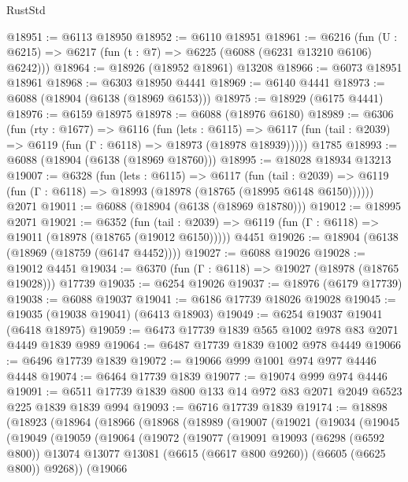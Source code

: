 \begin{lexlean}{RustStd}
\begin{coremodule}
@18951 := @6113 @18950
@18952 := @6110 @18951
@18961 := @6216
    (fun (U : @6215) => @6217 (fun (t : @7) => @6225 (@6088 (@6231 @13210 @6106) @6242)))
@18964 := @18926 (@18952 @18961) @13208
@18966 := @6073 @18951 @18961
@18968 := @6303 @18950 @4441
@18969 := @6140 @4441
@18973 := @6088 (@18904 (@6138 (@18969 @6153)))
@18975 := @18929 (@6175 @4441)
@18976 := @6159 @18975
@18978 := @6088 (@18976 @6180)
@18989 := @6306
    (fun (rty : @1677) =>
    @6116
      (fun (lets : @6115) =>
      @6117 (fun (tail : @2039) => @6119 (fun (Γ : @6118) => @18973 (@18978 @18939)))))
    @1785
@18993 := @6088 (@18904 (@6138 (@18969 @18760)))
@18995 := @18028 @18934 @13213
@19007 := @6328
    (fun (lets : @6115) =>
    @6117
      (fun (tail : @2039) =>
      @6119 (fun (Γ : @6118) => @18993 (@18978 (@18765 (@18995 @6148 @6150))))))
    @2071
@19011 := @6088 (@18904 (@6138 (@18969 @18780)))
@19012 := @18995 @2071
@19021 := @6352
    (fun (tail : @2039) => @6119 (fun (Γ : @6118) => @19011 (@18978 (@18765 (@19012 @6150)))))
    @4451
@19026 := @18904 (@6138 (@18969 (@18759 (@6147 @4452))))
@19027 := @6088 @19026
@19028 := @19012 @4451
@19034 := @6370 (fun (Γ : @6118) => @19027 (@18978 (@18765 @19028))) @17739
@19035 := @6254 @19026
@19037 := @18976 (@6179 @17739)
@19038 := @6088 @19037
@19041 := @6186 @17739 @18026 @19028
@19045 := @19035 (@19038 @19041) (@6413 @18903)
@19049 := @6254 @19037 @19041 (@6418 @18975)
@19059 := @6473 @17739 @1839 @565 @1002 @978 @83 @2071 @4449 @1839 @989
@19064 := @6487 @17739 @1839 @1002 @978 @4449
@19066 := @6496 @17739 @1839
@19072 := @19066 @999 @1001 @974 @977 @4446 @4448
@19074 := @6464 @17739 @1839
@19077 := @19074 @999 @974 @4446
@19091 := @6511 @17739 @1839 @800 @133 @14 @972 @83 @2071 @2049 @6523 @225 @1839 @1839 @994
@19093 := @6716 @17739 @1839
@19174 := @18898
    (@18923
      (@18964
        (@18966
          (@18968
            (@18989
              (@19007
                (@19021
                  (@19034
                    (@19045
                      (@19049
                        (@19059
                          (@19064
                            (@19072
                              (@19077
                                (@19091
                                  @19093
                                  (@6298 (@6592 @800))
                                  @13074
                                  @13077
                                  @13081
                                  (@6615 (@6617 @800 @9260))
                                  (@6605 (@6625 @800))
                                  @9268))
                              (@19066

\end{coremodule}
\end{lexlean}
